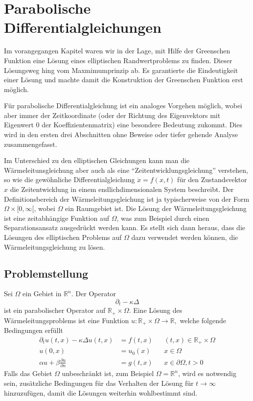 %
%
%
\chapter{Parabolische Differentialgleichungen\label{chapter-parabolisch}}
\rhead{}
Im vorangegangen Kapitel waren wir in der Lage, mit Hilfe der Greenschen
Funktion eine Lösung eines elliptischen Randwertproblems zu finden.
Dieser Lösungsweg hing vom Maxmimumprinzip ab.
Es garantierte die Eindeutigkeit einer
Lösung und machte damit die Konstruktion der Greenschen Funktion
erst möglich.

Für parabolische Differentialgleichung ist ein analoges Vorgehen
möglich, wobei aber immer der Zeitkoordinate (oder der Richtung
des Eigenvektors mit Eigenwert $0$ der Koeffizientenmatrix)
eine besondere Bedeutung zukommt.
Dies wird in den ersten drei
Abschnitten ohne Beweise  oder tiefer gehende Analyse zusammengefasst.

Im Unterschied zu den elliptischen
Gleichungen kann man die Wärmeleitunsgleichung aber auch
als eine ``Zeitentwicklungsgleichung'' verstehen, so wie die
gewöhnliche Differentialgleichung $\dot x=f(x,t)$
für den Zustandsvektor $x$ die Zeitentwicklung in einem endlichdimensionalen
System beschreibt. Der Definitionsbereich der Wärmeleitungsgleichung
ist ja typischerweise von der Form $\Omega\times[0,\infty[$, wobei
$\Omega$ ein Raumgebiet ist.
Die Lösung der Wärmeleitungsgleichung ist eine zeitabhängige Funktion
auf $\Omega$, was zum Beispiel durch einen Separationsansatz
ausgedrückt werden kann. Es stellt sich dann heraus, dass die Lösungen
des elliptischen Problems auf $\Omega$ dazu verwendet werden können,
die Wärmeleitungsgleichung zu lösen.

\section{Problemstellung}
Sei $\Omega$ ein Gebiet in $\mathbb R^n$. Der Operator 
\[
\partial_t-\kappa\Delta
\]
ist ein parabolischer Operator auf $\mathbb R_+\times \Omega$.
Eine Lösung des Wärmeleitungsproblems ist eine Funktion
$u\colon\mathbb R_+\times\Omega\to\mathbb R,$
welche folgende Bedingungen erfüllt
\begin{align*}
\partial_tu(t,x)-\kappa\Delta u(t,x)&=f(t,x)&&(t,x)\in\mathbb R_+\times\Omega
\\
u(0,x)&=u_0(x)&&x\in\Omega
\\
\alpha u+\beta\frac{\partial u}{\partial n}&=g(t, x)&&x\in\partial\Omega, t>0
\end{align*}
Falls das Gebiet $\Omega$ unbeschränkt ist, zum Beispiel $\Omega=\mathbb R^n$,
wird es notwendig sein, zusätzliche Bedingungen für das Verhalten
der Lösung für $t\to\infty$ hinzuzufügen, damit die Lösungen weiterhin
wohlbestimmt sind.

